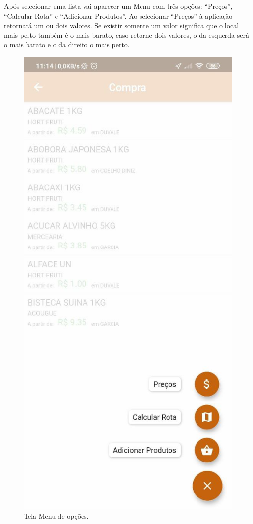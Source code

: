 Após selecionar uma lista vai aparecer um Menu com três opções: “Preços”, “Calcular Rota” e “Adicionar Produtos”. Ao selecionar “Preços” à aplicação retornará um ou dois valores. Se existir somente um valor significa que o local mais perto também é o mais barato, caso retorne dois valores, o da esquerda será o mais barato e o da direito o mais perto.
\begin{figure}[H]
    \centering
    \caption{Tela Menu de opções.}
    \includegraphics[scale=0.3]{Imagens/Print06.png}
\end{figure}


